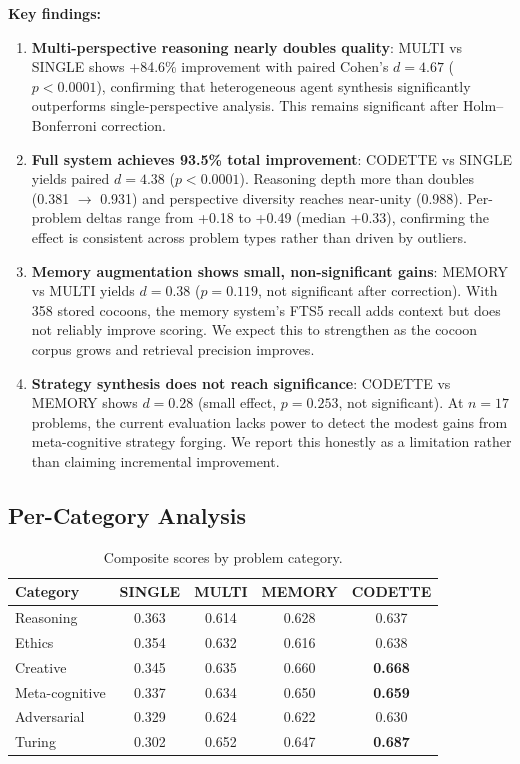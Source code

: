 \documentclass[11pt,a4paper]{article}
\begin{document}
\textbf{Key findings:}
\begin{enumerate}[nosep]
  \item \textbf{Multi-perspective reasoning nearly doubles quality}: MULTI vs SINGLE shows +84.6\% improvement with paired Cohen's $d = 4.67$ ($p < 0.0001$), confirming that heterogeneous agent synthesis significantly outperforms single-perspective analysis. This remains significant after Holm--Bonferroni correction.

  \item \textbf{Full system achieves 93.5\% total improvement}: CODETTE vs SINGLE yields paired $d = 4.38$ ($p < 0.0001$). Reasoning depth more than doubles (0.381 $\to$ 0.931) and perspective diversity reaches near-unity (0.988). Per-problem deltas range from +0.18 to +0.49 (median +0.33), confirming the effect is consistent across problem types rather than driven by outliers.

  \item \textbf{Memory augmentation shows small, non-significant gains}: MEMORY vs MULTI yields $d = 0.38$ ($p = 0.119$, not significant after correction). With 358 stored cocoons, the memory system's FTS5 recall adds context but does not reliably improve scoring. We expect this to strengthen as the cocoon corpus grows and retrieval precision improves.

  \item \textbf{Strategy synthesis does not reach significance}: CODETTE vs MEMORY shows $d = 0.28$ (small effect, $p = 0.253$, not significant). At $n = 17$ problems, the current evaluation lacks power to detect the modest gains from meta-cognitive strategy forging. We report this honestly as a limitation rather than claiming incremental improvement.
\end{enumerate}

\subsection{Per-Category Analysis}

\begin{table}[ht]
\centering
\caption{Composite scores by problem category.}
\label{tab:categories}
\begin{tabular}{lcccc}
\toprule
\textbf{Category} & \textbf{SINGLE} & \textbf{MULTI} & \textbf{MEMORY} & \textbf{CODETTE} \\
\midrule
Reasoning     & 0.363 & 0.614 & 0.628 & 0.637 \\
Ethics        & 0.354 & 0.632 & 0.616 & 0.638 \\
Creative      & 0.345 & 0.635 & 0.660 & \textbf{0.668} \\
Meta-cognitive & 0.337 & 0.634 & 0.650 & \textbf{0.659} \\
Adversarial   & 0.329 & 0.624 & 0.622 & 0.630 \\
Turing        & 0.302 & 0.652 & 0.647 & \textbf{0.687} \\
\bottomrule
\end{tabular}
\end{table}
\end{document}
